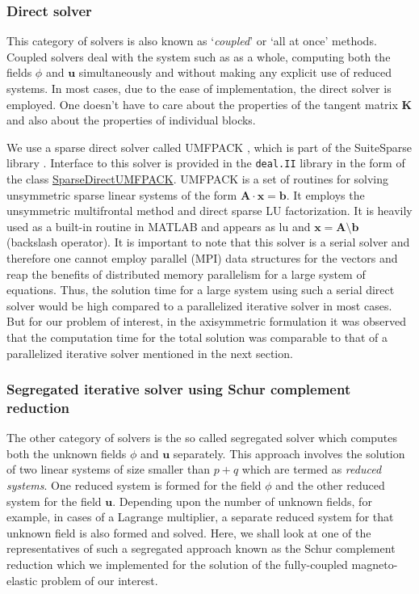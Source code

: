 \subsubsection{Direct solver}
This category of solvers is also known as `\textit{coupled}' or `all at once' methods. Coupled solvers deal with the system such as  as a whole, computing both the fields $\phi$ and $\mathbf{u}$ simultaneously and without making any explicit use of reduced systems. In most cases, due to the ease of implementation, the direct solver is employed. One doesn't have to care about the properties of the tangent matrix $\mathbf{K}$ and also about the properties of individual blocks. \par 

We use a sparse direct solver called UMFPACK \cite{davis2004algorithm}, which is part of the SuiteSparse library \cite{davis2015suitesparse}. Interface to this solver is provided in the \texttt{deal.II} \cite{dealII90} library in the form of the class \href{https://www.dealii.org/current/doxygen/deal.II/classSparseDirectUMFPACK.html}{SparseDirectUMFPACK}. UMFPACK is a set of routines for solving unsymmetric sparse linear systems of the form $\mathbf{A} \cdot \mathbf{x} = \mathbf{b}$. It employs the unsymmetric multifrontal method and direct sparse LU factorization. It is heavily used as a built-in routine in MATLAB\textsuperscript{\tiny\sffamily\textregistered} and appears as lu and $\mathbf{x} = \mathbf{A} \setminus \mathbf{b}$ (backslash operator). It is important to note that this solver is a serial solver and therefore one cannot employ parallel (MPI) data structures for the vectors and reap the benefits of distributed memory parallelism for a large system of equations. Thus, the solution time for a large system using such a serial direct solver would be high compared to a parallelized iterative solver in most cases. But for our problem of interest, in the axisymmetric formulation it was observed that the computation time for the total solution was comparable to that of a parallelized iterative solver mentioned in the next section.

\subsubsection{Segregated iterative solver using Schur complement reduction}
The other category of solvers is the so called segregated solver which computes both the unknown fields $\phi$ and $\mathbf{u}$ separately. This approach involves the solution of two linear systems of size smaller than $p+q$ which are termed as \textit{reduced systems}. One reduced system is formed for the field $\phi$ and the other reduced system for the field $\mathbf{u}$. Depending upon the number of unknown fields, for example, in cases of a Lagrange multiplier, a separate reduced system for that unknown field is also formed and solved. Here, we shall look at one of the representatives of such a segregated approach known as the Schur complement reduction which we implemented for the solution of the fully-coupled magneto-elastic problem of our interest. \par 

